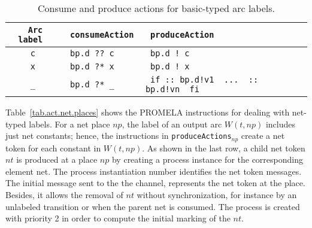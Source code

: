 \documentclass{llncs}
\begin{document}
\small


\begin{table}[h!]
\begin{center}\begin{tabular}{|c|l|l|l|}
      \hline
\verb" Arc label "  & \verb" consumeAction " & \verb" produceAction " \\
      \hline
      \verb"c"  & \verb" bp.d ?? c "  & \verb" bp.d ! c " \\
      \hline
      \verb"x"  & \verb" bp.d ?* x "  & \verb" bp.d ! x "\\
      \hline
      \verb"_"  & \verb" bp.d ?* _ "  & \verb" if :: bp.d!v1  ...  :: bp.d!vn  fi  "\\
      \hline
\end{tabular}\end{center}
\vspace{-2pt}
\caption{Consume and produce actions for basic-typed arc labels.}
\label{tab.act.bas.places}
\end{table}
\normalsize


Table~\ref{tab.act.net.places} shows the PROMELA instructions for dealing with net-typed labels. For a net place $np$, the label of an output arc $W(t,np)$ includes just net constants; hence, the instructions in \small\verb"produceActions"\nfont$_{np}$ create a net token for each constant in $W(t,np)$. As shown in the last row, a child net token $nt$ is produced at a place $np$ by creating a process instance for the corresponding element net. The process instantiation number identifies the net token messages. The initial message sent to the the channel, represents the net token at the place. Besides, it allows the removal of $nt$ without  synchronization, for instance by an unlabeled transition or when the parent net is consumed. The process is created with priority 2 in order to compute the initial marking of the $nt$.
\end{document}
